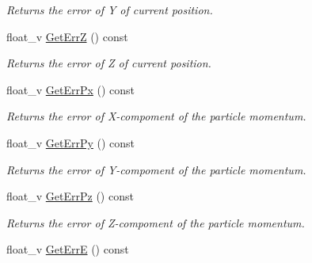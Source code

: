 \begin{DoxyCompactItemize}
\begin{DoxyCompactList}\small\item\em Returns the error of Y of current position. \end{DoxyCompactList}\item 
float\+\_\+v \hyperlink{classKFParticleSIMD_a781036a835f001708e9a35b221b2bc00}{Get\+ErrZ} () const \hypertarget{classKFParticleSIMD_a781036a835f001708e9a35b221b2bc00}{}\label{classKFParticleSIMD_a781036a835f001708e9a35b221b2bc00}

\begin{DoxyCompactList}\small\item\em Returns the error of Z of current position. \end{DoxyCompactList}\item 
float\+\_\+v \hyperlink{classKFParticleSIMD_af309d5fab0ae5ccefe5f086c11143e04}{Get\+Err\+Px} () const \hypertarget{classKFParticleSIMD_af309d5fab0ae5ccefe5f086c11143e04}{}\label{classKFParticleSIMD_af309d5fab0ae5ccefe5f086c11143e04}

\begin{DoxyCompactList}\small\item\em Returns the error of X-\/compoment of the particle momentum. \end{DoxyCompactList}\item 
float\+\_\+v \hyperlink{classKFParticleSIMD_a9945e5f64ab3104737a83dfa8651da3c}{Get\+Err\+Py} () const \hypertarget{classKFParticleSIMD_a9945e5f64ab3104737a83dfa8651da3c}{}\label{classKFParticleSIMD_a9945e5f64ab3104737a83dfa8651da3c}

\begin{DoxyCompactList}\small\item\em Returns the error of Y-\/compoment of the particle momentum. \end{DoxyCompactList}\item 
float\+\_\+v \hyperlink{classKFParticleSIMD_a8f6fefddc1a1482ed4ac8f087d377f70}{Get\+Err\+Pz} () const \hypertarget{classKFParticleSIMD_a8f6fefddc1a1482ed4ac8f087d377f70}{}\label{classKFParticleSIMD_a8f6fefddc1a1482ed4ac8f087d377f70}

\begin{DoxyCompactList}\small\item\em Returns the error of Z-\/compoment of the particle momentum. \end{DoxyCompactList}\item 
float\+\_\+v \hyperlink{classKFParticleSIMD_aeb88dc2944d959f9579398135fedc24e}{Get\+ErrE} () const \hypertarget{classKFParticleSIMD_aeb88dc2944d959f9579398135fedc24e}{}\label{classKFParticleSIMD_aeb88dc2944d959f9579398135fedc24e}


\end{DoxyCompactItemize}
